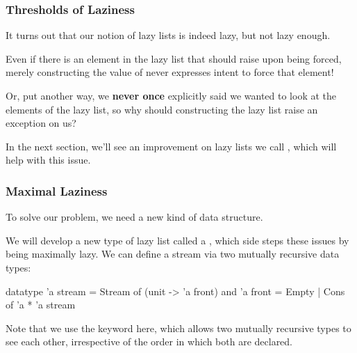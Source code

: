 \documentclass[aspectratio=169]{beamer}
\begin{document}
\begin{frame}[fragile]
  \frametitle{Thresholds of Laziness}

  It turns out that our notion of lazy lists is indeed lazy, but not
  lazy enough.

  \pause
  \vspace{\fill}

  Even if there is an element in the lazy list that should raise 
  upon being forced, merely constructing the value of 
  never expresses intent to force that element!

  \pause
  \vspace{\fill}

  Or, put another way, we \textbf{never once} explicitly said
  we wanted to look at the elements of the lazy list, so why should constructing
  the lazy list raise an exception on us?

  \pause
  \vspace{\fill}

  In the next section, we'll see an improvement on lazy lists we call ,
  which will help with this issue.
\end{frame}


\begin{frame}[fragile]
  \frametitle{Maximal Laziness}

  To solve our problem, we need a new kind of data structure.

  \pause
  \vspace{\fill}


  \pause
  \vspace{\fill}

  We will develop a new type of lazy list called a , which side steps
  these issues by being maximally lazy. We can define a stream via two mutually
  recursive data types:

  \begin{codeblock}
    datatype 'a stream = Stream of (unit -> 'a front)
    and 'a front = Empty | Cons of 'a * 'a stream
  \end{codeblock}

  \pause
  \vspace{\fill}

  Note that we use the  keyword here, which allows two mutually recursive
  types to see each other, irrespective of the order in which both are declared.
\end{frame}
\end{document}
